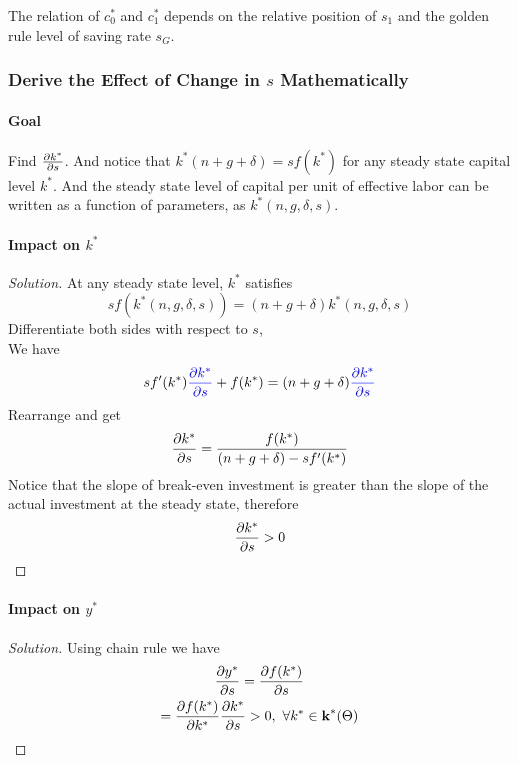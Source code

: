 \documentclass[11pt]{article}
\begin{document}
			\begin{remark}
				The relation of $c_0^*$ and $c_1^*$ depends on the relative position of $s_1$ and the golden rule level of saving rate $s_G$.
			\end{remark}
			
			\subsubsection{Derive the Effect of Change in $s$ Mathematically}
				\paragraph{Goal} Find $\frac{\partial{k^*}}{\partial{s}}$. And notice that $k^*(n+g+\delta) = sf(k^*)$ for any steady state capital level $k^*$. And the steady state level of capital per unit of effective labor can be written as a function of parameters, as $k^*(n, g, \delta, s)$.
				
			\paragraph{Impact on $k^*$}
			\begin{proof}[Solution]
				At any steady state level, $k^*$ satisfies \\
				\begin{equation}
					sf(k^*(n,g,\delta,s)) = (n+g+\delta)k^*(n,g,\delta,s)
				\end{equation}
				Differentiate both sides with respect to $s$, \\
				We have 
				\begin{equation}
					sf'(k^*)\textcolor{blue}{\frac{\partial{k^*}}{\partial{s}}} + f(k^*) = (n+g+\delta)\textcolor{blue}{\frac{\partial{k^*}}{\partial{s}}}
				\end{equation}
				Rearrange and get 
				\begin{equation}
					\frac{\partial{k^*}}{\partial{s}} = \frac{f(k^*)}{(n+g+\delta) - sf'(k^*)}
				\end{equation}
				Notice that the slope of break-even investment is greater than the slope of the actual investment at the steady state, therefore 
				\begin{equation}
					\frac{\partial{k^*}}{\partial{s}} > 0
				\end{equation}
			\end{proof}
			
			\paragraph{Impact on $y^*$}
			\begin{proof}[Solution]
				Using chain rule we have
				\begin{gather}
					\frac{\partial{y^*}}{\partial{s}} = \frac{\partial{f(k^*)}}{\partial{s}} \\
					= \frac{\partial{f(k^*)}}{\partial{k^*}} \frac{\partial{k^*}}{\partial{s}} > 0,\ \forall k^* \in \textbf{k}^*({\Theta})
				\end{gather}
			\end{proof}
			
\end{document}
